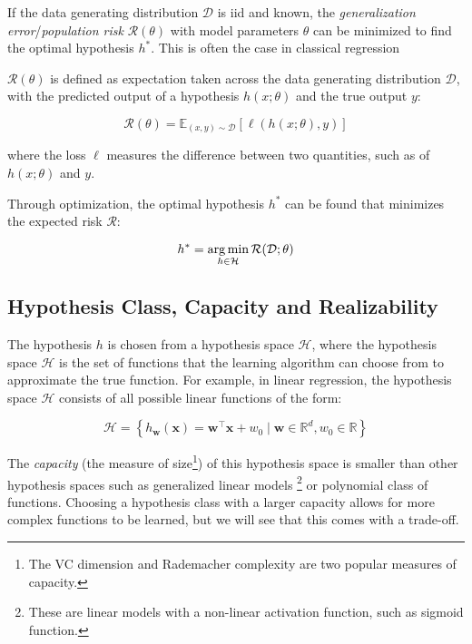 If the data generating distribution $\mathcal{D}$ is \gls{iid} and known, the \textit{generalization error}/\textit{population risk} $\mathcal{R}(\theta)$ with model parameters $\theta$ can be minimized to find the optimal hypothesis $h^*$. This is often the case in classical regression 

$\mathcal{R}(\theta)$ is defined as expectation taken across the data generating distribution $\mathcal{D}$, with the predicted output of a hypothesis $h(x; \theta)$ and the true output $y$:

\begin{equation}
    \mathcal{R}(\theta) = \mathbb{E}_{(x, y) \sim \mathcal{D}} \left[ \ell(h(x; \theta), y) \right]
\end{equation}

where the loss $\ell$ measures the difference between two quantities, such as of $h(x; \theta)$ and $y$.

Through optimization, the optimal hypothesis $h^*$ can be found that minimizes the expected risk $\mathcal{R}$:

\begin{equation}
    h^* = \operatorname*{arg\,min}_{h \in \mathcal{H}} \mathcal{R}(\mathcal{D}; \theta)
\end{equation}

\subsection{Hypothesis Class, Capacity and Realizability}
The hypothesis $h$ is chosen from a hypothesis space $\mathcal{H}$, where the hypothesis space $\mathcal{H}$ is the set of functions that the learning algorithm can choose from to approximate the true function. 
For example, in linear regression, the hypothesis space $\mathcal{H}$ consists of all possible linear functions of the form:

\begin{equation*}
   \mathcal{H} =  \left\{ h_{\mathbf{w}}(\mathbf{x}) = \mathbf{w}^\top \mathbf{x} + w_0 \mid \mathbf{w} \in \mathbb{R}^d, w_0 \in \mathbb{R} \right\}
\end{equation*}

The \textit{capacity} (the measure of size\footnote{The VC dimension and Rademacher complexity are two popular measures of capacity.}) of this hypothesis space is smaller than other hypothesis spaces such as generalized linear models
\footnote{These are linear models with a non-linear activation function, such as sigmoid function.} 
or polynomial class of functions. Choosing a hypothesis class with a larger capacity allows for more complex functions to be learned, but we will see that this comes with a trade-off.

